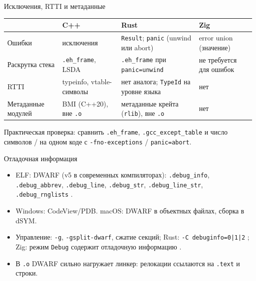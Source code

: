 \documentclass[aspectratio=169,11pt]{beamer}
\newcommand{\sym}[1]{\texttt{\detokenize{#1}}}
\begin{document}
\begin{frame}{Исключения, RTTI и метаданные}
  \small
  \begin{center}
    \begin{tabularx}{0.98\textwidth}{lYYY}
      \toprule
                         & C++ \cite{itanium}            & Rust \cite{rustref}                                & Zig \cite{zigdoc}       \\
      \midrule
      Ошибки             & исключения                    & \texttt{Result}; \texttt{panic} (unwind или abort) & error union (значение)  \\
      Раскрутка стека    & \texttt{.eh\_frame}, LSDA     & \texttt{.eh\_frame} при \texttt{panic=unwind}      & не требуется для ошибок \\
      RTTI               & typeinfo, vtable-символы      & нет аналога; \texttt{TypeId} на уровне языка       & нет                     \\
      Метаданные модулей & BMI (C++20), вне \texttt{.o}  & метаданные крейта (\texttt{rlib}), вне \texttt{.o} & нет                     \\
      \bottomrule
    \end{tabularx}
  \end{center}
  \medskip
  Практическая проверка: сравнить \texttt{.eh\_frame}, \texttt{.gcc\_except\_table} и число символов \sym{_ZTV}/\sym{_ZTI} на одном коде с \texttt{-fno-exceptions} / \texttt{panic=abort}.
\end{frame}

\begin{frame}{Отладочная информация}
  \begin{itemize}
    \item ELF: DWARF (v5 в современных компиляторах): \texttt{.debug\_info}, \texttt{.debug\_abbrev}, \texttt{.debug\_line}, \texttt{.debug\_str}, \texttt{.debug\_line\_str}, \texttt{.debug\_rnglists} \cite{dwarf}.
    \item Windows: CodeView/PDB. macOS: DWARF в объектных файлах, сборка в dSYM.
    \item Управление: \texttt{-g}, \texttt{-gsplit-dwarf}, сжатие секций; Rust: \texttt{-C debuginfo=0|1|2} \cite{rustcbook}; Zig: режим \texttt{Debug} содержит отладочную информацию \cite{zigdoc}.
    \item В \texttt{.o} DWARF сильно нагружает линкер: релокации ссылаются на \texttt{.text} и строки.
  \end{itemize}
\end{frame}
\end{document}
